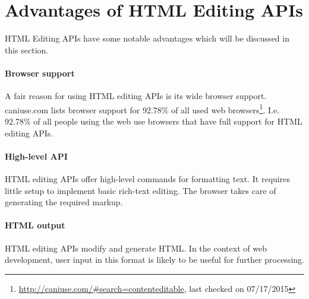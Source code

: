 

\section{Advantages of HTML Editing APIs}

HTML Editing APIs have some notable advantages which will be discussed in this section.

\paragraph{Browser support}

A fair reason for using HTML editing APIs is its wide browser support. caniuse.com lists browser support for 92.78\% of all used web browsers\footnote{\url{http://caniuse.com/#search=contenteditable}, last checked on 07/17/2015}. I.e. 92.78\% of all people using the web use browsers that have full support for HTML editing APIs.

\paragraph{High-level API}

HTML editing APIs offer high-level commands for formatting text. It requires little setup to implement basic rich-text editing. The browser takes care of generating the required markup.

\paragraph{HTML output}

HTML editing APIs modify and generate HTML. In the context of web development, user input in this format is likely to be useful for further processing.

